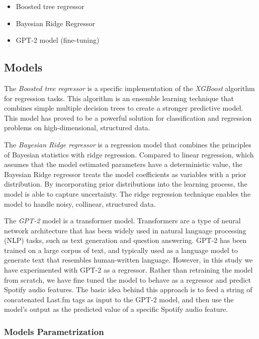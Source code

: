 \documentclass[sn-mathphys]{sn-jnl}%
\theoremstyle{thmstyleone}%
\theoremstyle{thmstyletwo}%
\theoremstyle{thmstylethree}%
\begin{document}
\begin{itemize}
      \item Boosted tree regressor \cite{xgboost}
      \item Bayesian Ridge Regressor \cite{bayesian}
      \item GPT-2 model (fine-tuning) \cite{radford2019language}
\end{itemize}


\subsection{Models}

The \emph{Boosted tree regressor} is a specific implementation of the \emph{XGBoost} algorithm for regression tasks.
This algorithm is an ensemble learning technique that combines simple multiple decision trees to
create a stronger predictive model.
This model has proved to be a powerful solution for classification and regression problems on high-dimensional, structured data.

The \emph{Bayesian Ridge regressor} is a regression model that combines the principles of Bayesian statistics with ridge regression.
Compared to linear regression, which assumes that the model estimated parameters have a deterministic value, the Bayesian Ridge regressor treats the model coefficients as variables with a prior distribution.
By incorporating prior distributions into the learning process, the model is able to capture uncertainty.
The ridge regression technique enables the model to handle noisy, collinear, structured data.

The \emph{GPT-2} model is a transformer model.
Transformers are a type of neural network architecture that has been widely used in natural language processing (NLP) tasks,
such as text generation and question answering.
GPT-2 has been trained on a large corpus of text, and typically used as a language model to generate text that resembles human-written language.
However, in this study we have experimented with GPT-2 as a regressor.
Rather than retraining the model from scratch, we have fine tuned the model to behave as a regressor and  predict Spotify audio features.
The basic idea behind this approach is to feed a string of concatenated Last.fm tags as input to the GPT-2 model, and then use the model's output as the predicted value of a specific Spotify audio feature.

\subsubsection{Models Parametrization}
\end{document}
